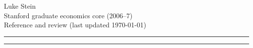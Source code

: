 \documentclass[8pt,letterpaper, landscape]{extarticle} %
\begin{document}
\noindent Luke Stein \\
Stanford graduate economics core (2006--7) \\
Reference and review (last updated \today)
\hrule
\setlength\columnseprule{.4pt} %
\begin{multicols}{4}
\tableofcontents
\end{multicols}
\hrule %
\setlength\columnseprule{0pt} %
\end{document}
